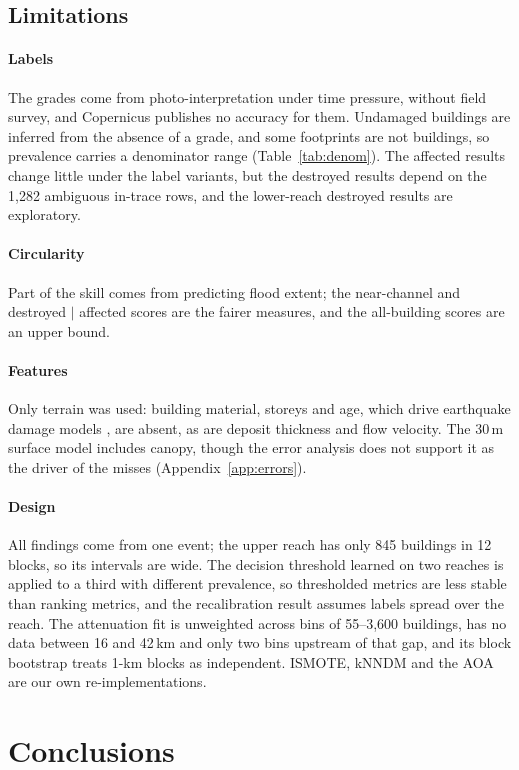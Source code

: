 \documentclass[journal,a4paper]{IEEEtran}
\begin{document}
\subsection*{Limitations}
\paragraph{Labels} The grades come from photo-interpretation under time pressure, without field survey, and Copernicus publishes no accuracy for them. Undamaged buildings are inferred from the absence of a grade, and some footprints are not buildings, so prevalence carries a denominator range (Table~\ref{tab:denom}). The affected results change little under the label variants, but the destroyed results depend on the 1,282 ambiguous in-trace rows, and the lower-reach destroyed results are exploratory.
\paragraph{Circularity} Part of the skill comes from predicting flood extent; the near-channel and destroyed $\mid$ affected scores are the fairer measures, and the all-building scores are an upper bound.
\paragraph{Features} Only terrain was used: building material, storeys and age, which drive earthquake damage models \citep{ghimire2022,ghimire2023}, are absent, as are deposit thickness and flow velocity. The 30\,m surface model includes canopy, though the error analysis does not support it as the driver of the misses (Appendix~\ref{app:errors}).
\paragraph{Design} All findings come from one event; the upper reach has only 845 buildings in 12 blocks, so its intervals are wide. The decision threshold learned on two reaches is applied to a third with different prevalence, so thresholded metrics are less stable than ranking metrics, and the recalibration result assumes labels spread over the reach. The attenuation fit is unweighted across bins of 55--3,600 buildings, has no data between 16 and 42\,km and only two bins upstream of that gap, and its block bootstrap treats 1-km blocks as independent. ISMOTE, kNNDM and the AOA are our own re-implementations.

\section{Conclusions}\label{sec:conclusion}
\end{document}
